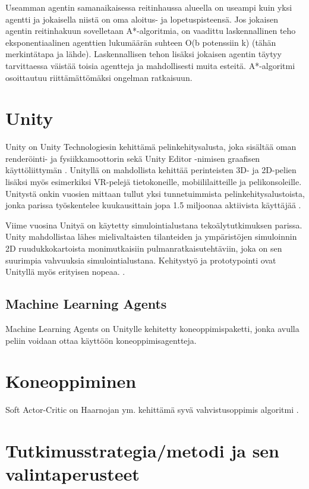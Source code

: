 \documentclass[utf8]{gradu3}
\begin{document}
Useamman agentin samanaikaisessa reitinhaussa alueella on useampi kuin yksi agentti ja jokaisella niistä on oma aloitus- ja lopetuspisteensä. Jos jokaisen agentin reitinhakuun sovelletaan A*-algoritmia, on vaadittu laskennallinen teho eksponentiaalinen agenttien lukumäärän suhteen O(b potenssiin k) (tähän merkintätapa ja lähde). Laskennallisen tehon lisäksi jokaisen agentin täytyy tarvittaessa väistää toisia agentteja ja mahdollisesti muita esteitä. A*-algoritmi osoittautuu riittämättömäksi ongelman ratkaisuun.

\chapter{Unity}

Unity on Unity Technologiesin kehittämä pelinkehitysalusta, joka sisältää oman renderöinti- ja fysiikkamoottorin sekä Unity Editor -nimisen graafisen käyttöliittymän \parencite{juliani2018unity}. Unityllä on mahdollista kehittää perinteisten 3D- ja 2D-pelien lisäksi myös esimerkiksi VR-pelejä tietokoneille, mobiililaitteille ja pelikonsoleille. Unitystä onkin vuosien mittaan tullut yksi tunnetuimmista pelinkehitysalustoista, jonka parissa työskentelee kuukausittain jopa 1.5 miljoonaa aktiivista käyttäjää \parencite{unityweb}.

Viime vuosina Unityä on käytetty simulointialustana tekoälytutkimuksen parissa. Unity mahdollistaa lähes mielivaltaisten tilanteiden ja ympäristöjen simuloinnin 2D ruudukkokartoista monimutkaisiin pulmanratkaisutehtäviin, joka on sen suurimpia vahvuuksia simulointialustana. Kehitystyö ja prototypointi ovat Unityllä myös erityisen nopeaa. \parencite{juliani2018unity}.

\section{Machine Learning Agents}

Machine Learning Agents on Unitylle kehitetty koneoppimispaketti, jonka avulla peliin voidaan ottaa käyttöön koneoppimisagentteja.

\chapter{Koneoppiminen}

Soft Actor-Critic on Haarnojan ym. kehittämä syvä vahvistusoppimis algoritmi \parencite{haarnoja2018soft}. 

\chapter{Tutkimusstrategia/metodi ja sen valintaperusteet}
\end{document}
